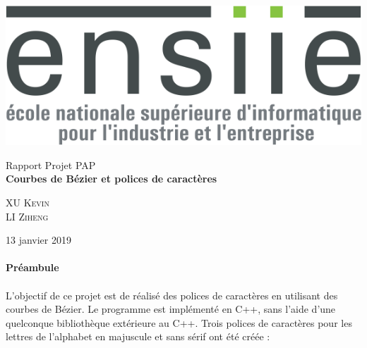 \documentclass[a4paper, 12pt]{article}
\begin{document}
\begin{titlepage}
			\includegraphics[scale=0.25]{Images/Logo_transparent.png} 
			\begin{center}
				\vspace*{6cm}
				{ \huge Rapport Projet PAP \\ \vspace*{2cm}
				\textbf{Courbes de Bézier et polices de caractères} \\
				}
			\vspace*{2cm}
				\begin{center} \large
					\textsc{XU} \textsc{Kevin}\\
					\textsc{LI} \textsc{Ziheng}
				\end{center}
				\begin{minipage}{0.4\textwidth}
				\end{minipage}
				{\large 13 janvier 2019}
			\end{center}
	\end{titlepage}
	
	\renewcommand{\contentsname}{Sommaire} 
	{\setlength{\baselineskip}{1.2\baselineskip}
\tableofcontents\par} %
		
	\newpage
	\vspace*{3cm} 
	\paragraph{\Huge{Préambule}}

	\paragraph{}
	L'objectif de ce projet est de réalisé des polices de caractères en utilisant des courbes de Bézier. Le programme est implémenté en C++, sans l’aide d’une quelconque bibliothèque extérieure au C++.
	Trois polices de caractères pour les lettres de l’alphabet en majuscule et sans sérif ont été créée : 	
	
\end{document}
